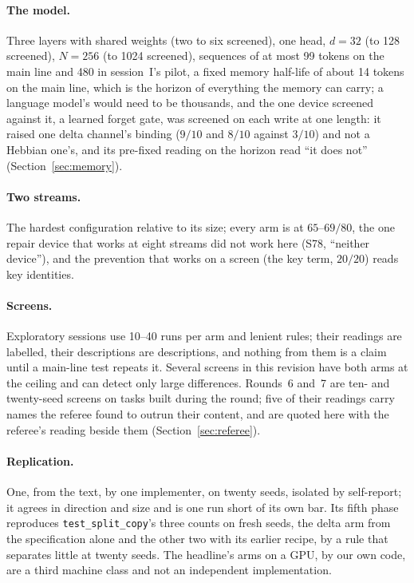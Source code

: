 \documentclass[11pt]{article}
\begin{document}
\paragraph{The model.} Three layers with shared weights (two to six screened), one head, $d = 32$ (to 128 screened), $N = 256$ (to 1024 screened), sequences of at most 99 tokens on the main line and 480 in session~I's pilot, a fixed memory half-life of about 14 tokens on the main line, which is the horizon of everything the memory can carry; a language model's would need to be thousands, and the one device screened against it, a learned forget gate, was screened on each write at one length: it raised one delta channel's binding ($9/10$ and $8/10$ against $3/10$) and not a Hebbian one's, and its pre-fixed reading on the horizon read ``it does not'' (Section~\ref{sec:memory}).

\paragraph{Two streams.} The hardest configuration relative to its size; every arm is at $65$--$69/80$, the one repair device that works at eight streams did not work here (S78, ``neither device''), and the prevention that works on a screen (the key term, $20/20$) reads key identities.

\paragraph{Screens.} Exploratory sessions use 10--40 runs per arm and lenient rules; their readings are labelled, their descriptions are descriptions, and nothing from them is a claim until a main-line test repeats it. Several screens in this revision have both arms at the ceiling and can detect only large differences. Rounds~6 and~7 are ten- and twenty-seed screens on tasks built during the round; five of their readings carry names the referee found to outrun their content, and are quoted here with the referee's reading beside them (Section~\ref{sec:referee}).

\paragraph{Replication.} One, from the text, by one implementer, on twenty seeds, isolated by self-report; it agrees in direction and size and is one run short of its own bar. Its fifth phase reproduces \texttt{test\_split\_copy}'s three counts on fresh seeds, the delta arm from the specification alone and the other two with its earlier recipe, by a rule that separates little at twenty seeds. The headline's arms on a GPU, by our own code, are a third machine class and not an independent implementation.
\end{document}

